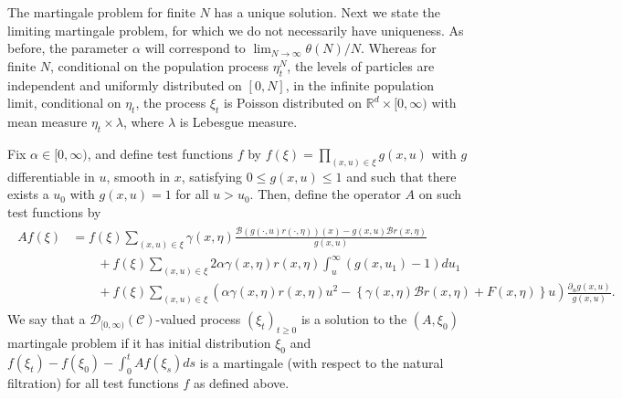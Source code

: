 \documentclass[EJP]{ejpecp} %
\newcommand{\IR}{\mathbb R}
\newcommand{\DG}{\mathcal{B}}  %
\newcommand{\lp}{\xi}              %
\begin{document}
The martingale problem for finite $N$ has a unique solution. 
Next we state the limiting martingale problem,
for which we do not necessarily have uniqueness.
As before, the parameter $\alpha$ will correspond to 
$\lim_{N\to\infty}\theta(N)/N$. Whereas for finite $N$, conditional
on the population process $\eta_t^N$, the levels of particles are
independent and 
uniformly distributed on $[0,N]$, in the infinite population limit, 
conditional on $\eta_t$, the process $\xi_t$ is Poisson distributed on 
$\IR^d\times [0,\infty)$ with mean measure $\eta_t\times\lambda$, where 
$\lambda$ %
is Lebesgue measure.

\begin{definition}
    \label{defn:limiting_lookdown_mgale}
    Fix $\alpha \in [0, \infty)$, and define  
    test functions $f$ by 
    $f(\xi) = \prod_{(x, u) \in \xi} g(x, u)$ 
	with $g$ differentiable in $u$, smooth in $x$, satisfying 
$0\leq g(x,u)\leq 1$ and
    such that there exists a $u_0$ with $g(x, u) = 1$ for all $u > u_0$.
    Then, define the operator $A$ on such test functions by 
    \begin{align} \begin{split} \label{eqn:limiting_lookdown_generator}
    A f(\lp)
    &=
        f(\lp)  \sum_{(x, u) \in \xi}
        \gamma(x, \eta)
            \frac{
                \DG(g(\cdot, u) r(\cdot, \eta))(x) - g(x,u) \DG r(x,\eta)
            }{
                g(x, u)
            }
    \\ &\qquad {} +
        f(\lp) \sum_{(x, u) \in \xi}
        2 \alpha \gamma(x, \eta) r(x, \eta) \int_u^\infty (g(x, u_1) - 1) du_1
    \\ &\qquad {} +
        f(\lp) \sum_{(x, u) \in \xi}
        \left(
            \alpha \gamma(x, \eta) r(x, \eta) u^2
            -
            \left\{
                \gamma(x, \eta) \DG r(x, \eta) + F(x, \eta)
            \right\} u
        \right)
        \frac{\partial_u g(x, u)}{ g(x,u) }  .
    \end{split} \end{align}
    We say that a ${\mathcal D}_{[0,\infty)}(\mathcal{C})$-valued process $(\xi_t)_{t \ge 0}$
    is a solution to the $(A, \lp_0)$ martingale problem
    if it has initial distribution $\lp_0$
    and $f(\lp_t) - f(\lp_0)-\int_0^t Af(\lp_s) ds$ is a martingale (with
respect to the natural filtration) for all 
test functions $f$
    as defined above.
\end{definition}
\end{document}
